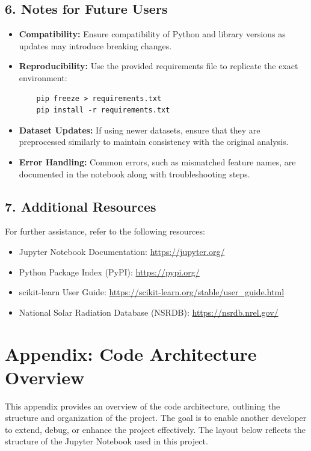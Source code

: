 \documentclass[10pt,twocolumn]{article}
\begin{document}
\begin{itemize}
\subsection*{6. Notes for Future Users}
\begin{itemize}
    \item \textbf{Compatibility:} Ensure compatibility of Python and library versions as updates may introduce breaking changes.
    \item \textbf{Reproducibility:} Use the provided requirements file to replicate the exact environment:
    \begin{verbatim}
    pip freeze > requirements.txt
    pip install -r requirements.txt
    \end{verbatim}
    \item \textbf{Dataset Updates:} If using newer datasets, ensure that they are preprocessed similarly to maintain consistency with the original analysis.
    \item \textbf{Error Handling:} Common errors, such as mismatched feature names, are documented in the notebook along with troubleshooting steps.
\end{itemize}

\subsection*{7. Additional Resources}
For further assistance, refer to the following resources:
\begin{itemize}
    \item Jupyter Notebook Documentation: \url{https://jupyter.org/}
    \item Python Package Index (PyPI): \url{https://pypi.org/}
    \item scikit-learn User Guide: \url{https://scikit-learn.org/stable/user_guide.html}
    \item National Solar Radiation Database (NSRDB): \url{https://nsrdb.nrel.gov/}
\end{itemize}




\section*{Appendix: Code Architecture Overview}

This appendix provides an overview of the code architecture, outlining the structure and organization of the project. The goal is to enable another developer to extend, debug, or enhance the project effectively. The layout below reflects the structure of the Jupyter Notebook used in this project.


\end{itemize}
\end{document}
